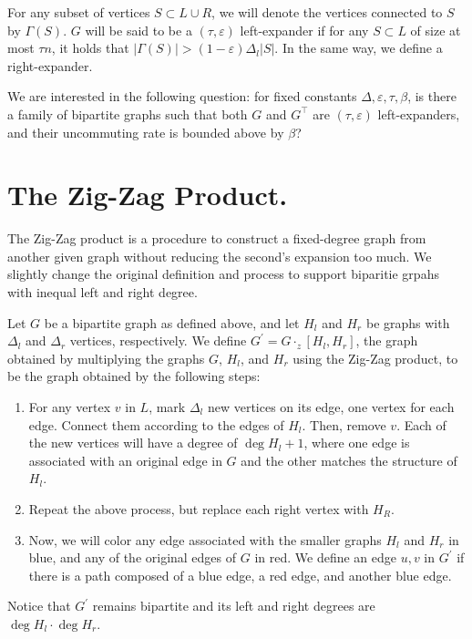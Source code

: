 \documentclass[manuscript,screen,review]{acmart}
\begin{document}
For any subset of vertices $S \subset L \cup R$, we will denote the vertices connected to $S$ by $\Gamma(S)$. $G$ will be said to be a $(\tau, \varepsilon)$ left-expander if for any $S \subset L$ of size at most $\tau n$, it holds that $|\Gamma(S)| > (1-\varepsilon)\Delta_{l}|S|$. In the same way, we define a right-expander.

We are interested in the following question: for fixed constants $\Delta, \varepsilon, \tau, \beta$, is there a family of bipartite graphs such that both $G$ and $G^{\top}$ are $(\tau,\varepsilon)$ left-expanders, and their uncommuting rate is bounded above by $\beta$?

\section{The Zig-Zag Product.}
The Zig-Zag product is a procedure to construct a fixed-degree graph from another given graph without reducing the second's expansion too much. We slightly change the original definition and process to support biparitie grpahs with inequal left and right degree. 
\begin{definition}
  Let $G$ be a bipartite graph as defined above, and let $H_{l}$ and $H_{r}$ be graphs with $\Delta_{l}$ and $\Delta_{r}$ vertices, respectively. We define $G^{\prime} = G \cdot_{z} [H_{l},H_{r}]$, the graph obtained by multiplying the graphs $G$, $H_{l}$, and $H_{r}$ using the Zig-Zag product, to be the graph obtained by the following steps:
  \begin{enumerate}
    \item For any vertex $v$ in $L$, mark $\Delta_{l}$ new vertices on its edge, one vertex for each edge. Connect them according to the edges of $H_{l}$. Then, remove $v$. Each of the new vertices will have a degree of $\deg H_{l} + 1$, where one edge is associated with an original edge in $G$ and the other matches the structure of $H_{l}$.
    \item Repeat the above process, but replace each right vertex with $H_{R}$.
    \item Now, we will color any edge associated with the smaller graphs $H_{l}$ and $H_{r}$ in blue, and any of the original edges of $G$ in red. We define an edge ${u,v}$ in $G^{\prime}$ if there is a path composed of a blue edge, a red edge, and another blue edge.
  \end{enumerate}
  Notice that $G^\prime$ remains bipartite and its left and right degrees are $\deg H_{l} \cdot \deg H_{r}$.
\end{definition}
\end{document}
